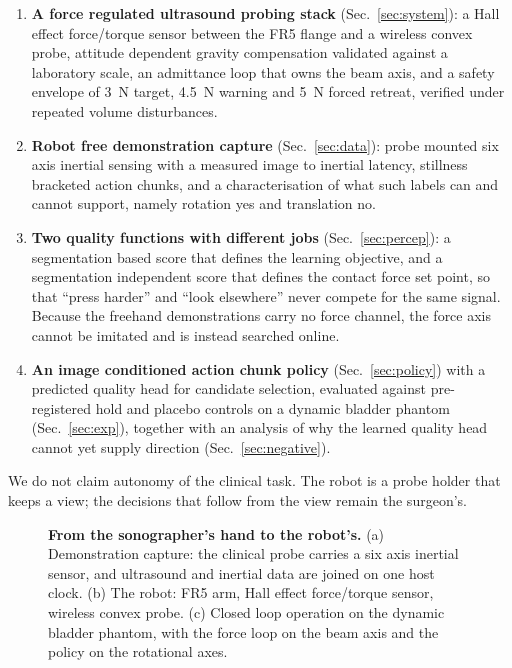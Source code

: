 \documentclass[conference]{IEEEtran}
\newcommand{\figspace}[1]{\vspace{#1}}
\begin{document}
\begin{enumerate}
\item \textbf{A force regulated ultrasound probing stack}
(Sec.~\ref{sec:system}): a Hall effect force/torque sensor between the FR5
flange and a wireless convex probe, attitude dependent gravity compensation
validated against a laboratory scale, an admittance loop that owns the beam
axis, and a safety envelope of \SI{3}{\newton} target, \SI{4.5}{\newton}
warning and \SI{5}{\newton} forced retreat, verified under repeated volume
disturbances.
\item \textbf{Robot free demonstration capture} (Sec.~\ref{sec:data}): probe
mounted six axis inertial sensing with a measured image to inertial latency,
stillness bracketed action chunks, and a characterisation of what such labels
can and cannot support, namely rotation yes and translation no.
\item \textbf{Two quality functions with different jobs}
(Sec.~\ref{sec:percep}): a segmentation based score that defines the learning
objective, and a segmentation independent score that defines the contact force
set point, so that ``press harder'' and ``look elsewhere'' never compete for the
same signal. Because the freehand demonstrations carry no force channel, the
force axis cannot be imitated and is instead searched online.
\item \textbf{An image conditioned action chunk policy}
(Sec.~\ref{sec:policy}) with a predicted quality head for candidate selection,
evaluated against pre-registered hold and placebo controls on a dynamic bladder
phantom (Sec.~\ref{sec:exp}), together with an analysis of why the learned
quality head cannot yet supply direction (Sec.~\ref{sec:negative}).
\end{enumerate}

We do not claim autonomy of the clinical task. The robot is a probe holder that
keeps a view; the decisions that follow from the view remain the surgeon's.

\begin{figure}[t]
\centering
\figspace{34mm}
\caption{\textbf{From the sonographer's hand to the robot's.} (a) Demonstration
capture: the clinical probe carries a six axis inertial sensor, and ultrasound
and inertial data are joined on one host clock. (b) The robot: FR5 arm, Hall
effect force/torque sensor, wireless convex probe. (c) Closed loop operation on
the dynamic bladder phantom, with the force loop on the beam axis and the policy
on the rotational axes.}
\label{fig:overview}
\end{figure}
\end{document}
